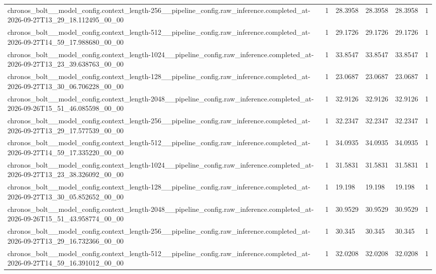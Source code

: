 \begin{tabular}{llllll}
chronos\_bolt\_\_model\_config.context\_length-256\_\_pipeline\_config.raw\_inference.completed\_at-2026-09-27T13\_29\_18.112495\_00\_00 & 1 & 28.3958 & 28.3958 & 28.3958 & 1 \\
chronos\_bolt\_\_model\_config.context\_length-512\_\_pipeline\_config.raw\_inference.completed\_at-2026-09-27T14\_59\_17.988680\_00\_00 & 1 & 29.1726 & 29.1726 & 29.1726 & 1 \\
chronos\_bolt\_\_model\_config.context\_length-1024\_\_pipeline\_config.raw\_inference.completed\_at-2026-09-27T13\_23\_39.638763\_00\_00 & 1 & 33.8547 & 33.8547 & 33.8547 & 1 \\
chronos\_bolt\_\_model\_config.context\_length-128\_\_pipeline\_config.raw\_inference.completed\_at-2026-09-27T13\_30\_06.706228\_00\_00 & 1 & 23.0687 & 23.0687 & 23.0687 & 1 \\
chronos\_bolt\_\_model\_config.context\_length-2048\_\_pipeline\_config.raw\_inference.completed\_at-2026-09-26T15\_51\_46.085598\_00\_00 & 1 & 32.9126 & 32.9126 & 32.9126 & 1 \\
chronos\_bolt\_\_model\_config.context\_length-256\_\_pipeline\_config.raw\_inference.completed\_at-2026-09-27T13\_29\_17.577539\_00\_00 & 1 & 32.2347 & 32.2347 & 32.2347 & 1 \\
chronos\_bolt\_\_model\_config.context\_length-512\_\_pipeline\_config.raw\_inference.completed\_at-2026-09-27T14\_59\_17.335220\_00\_00 & 1 & 34.0935 & 34.0935 & 34.0935 & 1 \\
chronos\_bolt\_\_model\_config.context\_length-1024\_\_pipeline\_config.raw\_inference.completed\_at-2026-09-27T13\_23\_38.326092\_00\_00 & 1 & 31.5831 & 31.5831 & 31.5831 & 1 \\
chronos\_bolt\_\_model\_config.context\_length-128\_\_pipeline\_config.raw\_inference.completed\_at-2026-09-27T13\_30\_05.852652\_00\_00 & 1 & 19.198 & 19.198 & 19.198 & 1 \\
chronos\_bolt\_\_model\_config.context\_length-2048\_\_pipeline\_config.raw\_inference.completed\_at-2026-09-26T15\_51\_43.958774\_00\_00 & 1 & 30.9529 & 30.9529 & 30.9529 & 1 \\
chronos\_bolt\_\_model\_config.context\_length-256\_\_pipeline\_config.raw\_inference.completed\_at-2026-09-27T13\_29\_16.732366\_00\_00 & 1 & 30.345 & 30.345 & 30.345 & 1 \\
chronos\_bolt\_\_model\_config.context\_length-512\_\_pipeline\_config.raw\_inference.completed\_at-2026-09-27T14\_59\_16.391012\_00\_00 & 1 & 32.0208 & 32.0208 & 32.0208 & 1 \\

\end{tabular}
